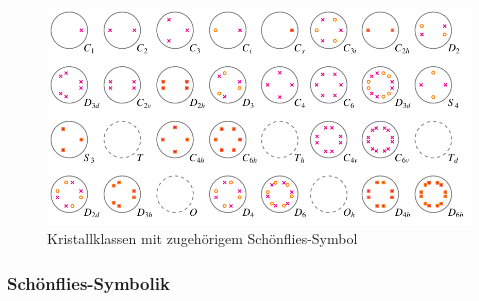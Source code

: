 \begin{figure}
    \centering
    \includegraphics[]{papers/punktgruppen/figures/projections}
    \caption{Kristallklassen mit zugehörigem Schönflies-Symbol}
    \label{fig:punktgruppen:Kristallkassen}
\end{figure}

\subsubsection{Schönflies-Symbolik}

